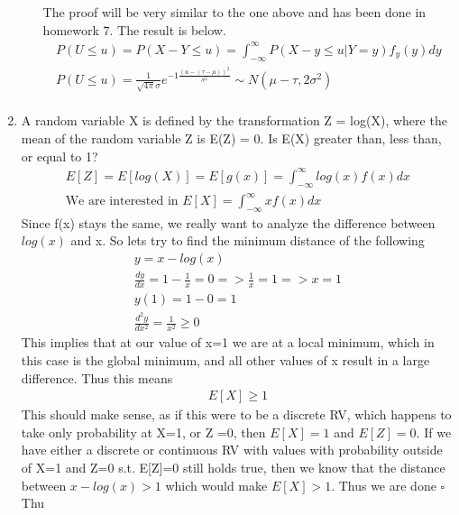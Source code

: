 \documentclass[11pt]{article}
\begin{document}
\begin{enumerate}
\begin{enumerate}
	The proof will be very similar to the one above and has been done in homework 7. The result is below.
	\begin{gather}
	P(U\le u) = P(X-Y\le u) = \int_{-\infty}^{\infty}P(X-y\le u|Y=y)f_y(y)dy\\
	P(U\le u)= \frac{1}{\sqrt{4\pi}\sigma}e^{-1\frac{(u-(\tau - \mu))^2}{\sigma^2}} \sim N(\mu-\tau,2\sigma^2)\\
	\end{gather}
\end{enumerate}
\item A random variable X is defined by the transformation Z = log(X), where the mean of the random variable Z is E(Z) = 0. Is E(X) greater than, less than, or equal to 1?
\begin{gather}
	E[Z]=E[log(X)]=E[g(x)] = \int_{-\infty}^{\infty}log(x)f(x)dx\\
	\text{We are interested in }E[X] = \int_{-\infty}^{\infty}xf(x)dx
\end{gather}
Since f(x) stays the same, we really want to analyze the difference between $log(x)$ and x. So lets try to find the minimum distance of the following 
\begin{gather}
	y = x-log(x)\\
	\frac{dy}{dx} = 1 - \frac{1}{x} = 0 => \frac{1}{x} = 1 => x = 1\\
	y(1) = 1-0 = 1\\
	\frac{d^2y}{dx^2} = \frac{1}{x^2}\ge 0 
\end{gather}
This implies that at our value of x=1 we are at a local minimum, which in this case is the global minimum, and all other values of x result in a large difference. Thus this means
\begin{gather}
	E[X]\ge 1
\end{gather}
This should make sense, as if this were to be a discrete RV, which happens to take only probability at X=1, or Z =0, then $E[X]=1$ and $E[Z]=0$. If we have either a discrete or continuous RV with values with probability outside of X=1 and Z=0 s.t. E[Z]=0 still holds true, then we know that the distance between $x- log(x) > 1$ which would make $E[X]>1$. Thus we are done $\square$  
Thu
\end{enumerate}
\end{document}
